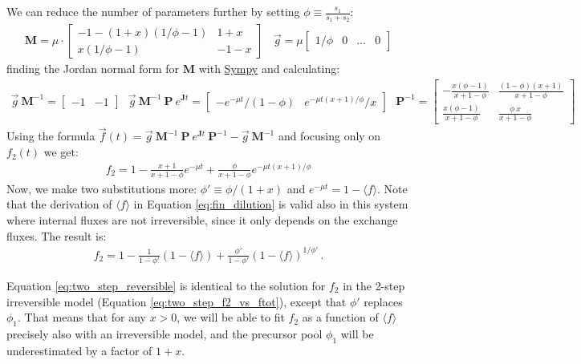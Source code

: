 \documentclass{article}
\newcommand{\fin}{\ensuremath{\langle f \rangle}}
\begin{document}
We can reduce the number of parameters further by setting $\phi \equiv \frac{s_1}{s_1+s_2}$:
\begin{eqnarray}
\mathbf{M} = \mu \cdot 
    \begin{bmatrix}
        - 1 - (1+x)(1/\phi-1) & 1+x \\
        x (1/\phi-1) & -1-x
    \end{bmatrix}
~~~~
\vec{g} = \mu \begin{bmatrix} 1/\phi & 0 & \ldots & 0 \end{bmatrix}
\end{eqnarray}
finding the Jordan normal form for $\mathbf{M}$ with \href{https://www.sympy.org/}{Sympy} and calculating:
\begin{eqnarray}
\vec{g}~\mathbf{M}^{-1} = 
\begin{bmatrix} -1 & -1 \end{bmatrix}
~~~
\vec{g}~\mathbf{M}^{-1}~\mathbf{P}~e^{\mathbf{J} t} = 
\begin{bmatrix} -e^{-\mu t} / (1-\phi) & e^{-\mu t (x+1)/\phi} / x\end{bmatrix}
~~~
\mathbf{P}^{-1} = 
    \begin{bmatrix}
		-\frac{x(\phi-1)}{x + 1 - \phi} & \frac{(1-\phi)(x+1)}{x + 1 - \phi} \\
		\frac{x(\phi-1)}{x + 1 - \phi} & \frac{\phi~x}{x + 1 - \phi} 
	\end{bmatrix}
\end{eqnarray}
Using the formula $\vec{f}(t) = \vec{g}~\mathbf{M}^{-1}~\mathbf{P}~e^{\mathbf{J} t}~\mathbf{P}^{-1} - \vec{g}~\mathbf{M}^{-1}$ and focusing only on $f_2(t)$ we get:
\begin{eqnarray}
    f_2 = 1 - \frac{x+1}{x+1-\phi} e^{-\mu t} + \frac{\phi}{x+1-\phi} e^{-\mu t (x+1)/\phi}
\end{eqnarray}
Now, we make two substitutions more: $\phi' \equiv \phi/(1+x)$ and $e^{-\mu t} = 1 - \fin$. Note that the derivation of $\fin$ in Equation \ref{eq:fin_dilution} is valid also in this system where internal fluxes are not irreversible, since it only depends on the exchange fluxes. The result is:
\begin{eqnarray}
    f_2 = 1 - \frac{1}{1-\phi'} (1-\fin) + \frac{\phi'}{1-\phi'} (1-\fin)^{1/\phi'}
	\label{eq:two_step_reversible}\,.
\end{eqnarray}

Equation \ref{eq:two_step_reversible} is identical to the solution for $f_2$ in the 2-step irreversible model (Equation \ref{eq:two_step_f2_vs_ftot}), except that $\phi'$ replaces $\phi_1$. That means that for any $x > 0$, we will be able to fit $f_2$ as a function of $\fin$ precisely also with an irreversible model, and the precursor pool $\phi_1$ will be underestimated by a factor of $1+x$.
\end{document}
